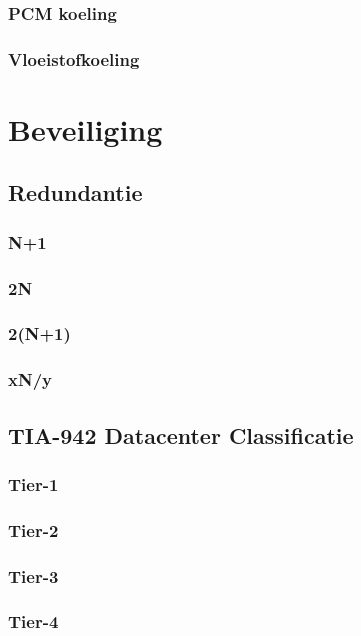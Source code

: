 \documentclass[a4paper,12pt,twoside,openright,titlepage]{book}
\begin{document}
\subsection{PCM koeling}

\subsection{Vloeistofkoeling}


\chapter{Beveiliging}
\section{Redundantie}

\subsection{N+1}

\subsection{2N}

\subsection{2(N+1)}

\subsection{xN/y}

\section{TIA-942 Datacenter Classificatie}

\subsection{Tier-1}

\subsection{Tier-2}

\subsection{Tier-3}

\subsection{Tier-4}

\end{document}
